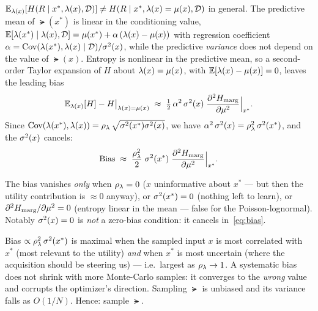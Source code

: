 \begin{proposition}\label{prop:bias}
$\mathbb{E}_{\lambda(x)}[H(R\mid x^{*},\lambda(x),\mathcal D)]\neq H(R\mid x^{*},\lambda(x)=\mu(x),\mathcal D)$
in general. The predictive mean of $\lat(x^{*})$ is linear in the conditioning
value, $\mathbb{E}[\lambda(x^{*})\mid\lambda(x),\mathcal D]=\mu(x^{*})+\alpha\,(\lambda(x)-\mu(x))$
with regression coefficient $\alpha=\mathrm{Cov}(\lambda(x^{*}),\lambda(x)\mid\mathcal D)/\sigma^{2}(x)$,
while the predictive \emph{variance} does not depend on the value of $\lat(x)$.
Entropy is nonlinear in the predictive mean, so a second-order Taylor expansion of
$H$ about $\lambda(x)=\mu(x)$, with $\mathbb{E}[\lambda(x)-\mu(x)]=0$, leaves the leading
bias
%
\begin{equation}
  \mathbb{E}_{\lambda(x)}[H] - H\big|_{\lambda(x)=\mu(x)}
  \;\approx\; \tfrac12\,\alpha^{2}\,\sigma^{2}(x)\;\frac{\partial^{2}H_{\mathrm{marg}}}{\partial\mu^{2}}\Big|_{x^{*}} .
  \label{eq:bias-raw}
\end{equation}
%
Since $\mathrm{Cov}(\lambda(x^{*}),\lambda(x))=\rho_{\lambda}\,\sqrt{\sigma^{2}(x^{*})\sigma^{2}(x)}$, we
have $\alpha^{2}\,\sigma^{2}(x)=\rho_{\lambda}^{2}\,\sigma^{2}(x^{*})$, and the $\sigma^{2}(x)$ cancels:
%
\begin{equation}
  \mathrm{Bias} \;\approx\; \frac{\rho_{\lambda}^{2}}{2}\;\sigma^{2}(x^{*})\;\frac{\partial^{2}H_{\mathrm{marg}}}{\partial\mu^{2}}\Big|_{x^{*}} .
  \label{eq:bias}
\end{equation}
\end{proposition}

The bias vanishes \emph{only} when $\rho_{\lambda}=0$ ($x$ uninformative about $x^{*}$ ---
but then the utility contribution is $\approx0$ anyway), or $\sigma^{2}(x^{*})=0$
(nothing left to learn), or $\partial^{2}H_{\mathrm{marg}}/\partial\mu^{2}=0$ (entropy
linear in the mean --- false for the Poisson-lognormal). Notably $\sigma^{2}(x)=0$ is
\emph{not} a zero-bias condition: it cancels in~\eqref{eq:bias}.

\begin{remark}\label{rem:bias-matters}
Bias $\propto\rho_{\lambda}^{2}\,\sigma^{2}(x^{*})$ is maximal when the sampled input $x$ is most
correlated with $x^{*}$ (most relevant to the utility) \emph{and} when $x^{*}$ is
most uncertain (where the acquisition should be steering us) --- i.e.\ largest as
$\rho_{\lambda}\to1$. A systematic bias does not shrink with more Monte-Carlo samples: it
converges to the \emph{wrong} value and corrupts the optimizer's direction.
Sampling $\lat$ is unbiased and its variance falls as $O(1/N)$. Hence: sample
$\lat$.
\end{remark}

